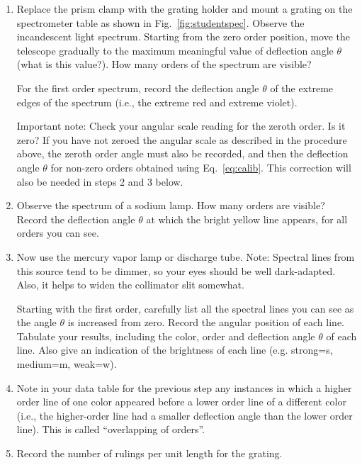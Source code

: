 \documentclass{article}
\begin{document}
\begin{enumerate}
\item Replace the prism clamp with the grating holder and mount a grating
on the spectrometer table as shown in Fig.~\ref{fig:studentspec}.  Observe the
incandescent light spectrum.  Starting from the zero order position,
move the telescope gradually to the maximum meaningful value of
deflection angle ${\theta}$ (what is this value?).  How many orders of
the spectrum are visible? 

For the first order spectrum, record the deflection angle ${\theta}$ of
the extreme edges of the spectrum (i.e., the extreme red and extreme
violet).

Important note: Check your angular scale reading for the zeroth order.
 Is it zero?  If you have not zeroed the angular scale as described
in the procedure above, the zeroth order angle must also be recorded,
and then the deflection angle ${\theta}$  for non-zero orders obtained
using Eq.~\ref{eq:calib}. This correction will also be needed in steps 2 and 3
below.

\item Observe the spectrum of a sodium lamp.  How many orders are
visible? Record the deflection angle ${\theta}$ at which the bright
yellow line appears, for all orders you can see.

\item Now use the mercury vapor lamp or discharge tube.  Note: Spectral
lines from this source tend to be dimmer, so your eyes should be well
dark-adapted.  Also, it helps to widen the collimator slit somewhat.

Starting with the first order, carefully list all the spectral lines you
can see as the angle ${\theta}$ is increased from zero.  Record the
angular position of each line. Tabulate your results, including the
color, order and deflection angle ${\theta}$ of each line.  Also give
an indication of the brightness of each line (e.g. strong=s, medium=m,
weak=w). 

\item Note in your data table for the previous step any instances in
which a higher order line of one color appeared before a lower order
line of a different color (i.e., the higher-order line had a smaller
deflection angle  than the lower order line).  This is called
``overlapping of orders''.

\item Record the number of rulings per unit length for the grating.
\end{enumerate}
\end{document}
